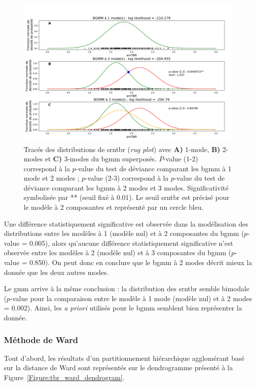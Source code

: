 \begin{figure}[h!]
  \centering
	\includegraphics[width=1.0\linewidth]{figures/chapter-4/tbr-bgmm} 
  \caption{Tracés des distributions de \gls{srntbr} (\textit{rug plot}) avec \textbf{A)} 1-mode, \textbf{B)} 2-modes et \textbf{C)} 3-modes du \gls{bgmm} superposés. $P$-value (1-2) correspond
	à la $p$-value du test de déviance comparant les \gls{bgmm} à 1 mode et 2 modes ; $p$-value (2-3) correspond à la $p$-value du test de déviance comparant les \gls{bgmm}
	à 2 modes et 3 modes. Significativité symbolisée par ** (seuil fixé à 0.01). Le seuil \gls{srntbr} est précisé pour le modèle à 2 composantes et représenté par un cercle bleu.}
  \label{Figure:tbr_bgmm} 
\end{figure}

Une différence statistiquement significative est observée dans la modélisation des distributions entre les modèles à 1 (modèle nul) et à 2 composantes 
du \gls{bgmm} ($p$-value = 0.005), alors qu'aucune différence statistiquement significative n'est observée entre les modèles à 2 (modèle nul) 
et à 3 composantes du \gls{bgmm} ($p$-value = 0.850). On peut donc en conclure que le \gls{bgmm} à 2 modes décrit mieux la donnée que les deux
autres modes. 

Le \gls{gmm} arrive à la même conclusion : la distribution des \gls{srntbr} semble bimodale ($p$-value pour la comparaison
entre le modèle à 1 mode (modèle nul) et à 2 modes = 0.002). Ainsi, les \textit{a priori} utilisés pour le \gls{bgmm} semblent bien 
représenter la donnée. 

\subsubsection{Méthode de Ward}
Tout d'abord, les résultats d'un partitionnement hiérarchique agglomérant basé sur la distance de Ward sont représentés sur le dendrogramme présenté à la 
Figure~\ref{Figure:tbr_ward_dendrogram}. 

